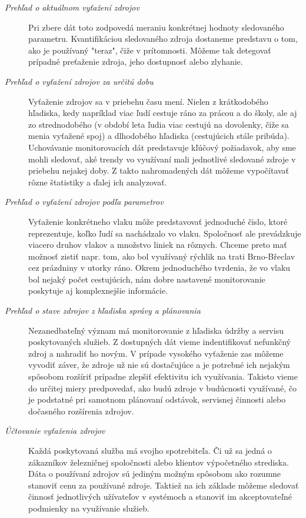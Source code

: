 \documentclass[11pt,final,oneside]{fithesis}
\begin{document}
\begin{description}
\item[\emph{Prehľad o aktuálnom vyťažení zdrojov}]
Pri zbere dát toto zodpovedá meraniu konkrétnej hodnoty sledovaného parametru. Kvantifikáciou sledovaného zdroja dostaneme predstavu o tom, ako je používaný "teraz", čiže v prítomnosti. Môžeme tak detegovať prípadné
preťaženie zdroja, jeho dostupnosť alebo zlyhanie.
\item[\emph{Prehľad o vyťažení zdrojov za určitú dobu}]
Vyťaženie zdrojov sa v priebehu času mení. Nielen z krátkodobého hľadiska, kedy napríklad viac ľudí cestuje ráno za prácou a do školy, ale aj zo strednodobého (v období leta ľudia viac cestujú na dovolenky, čiže sa menia 
vyťažené spoj) a dlhodobého hľadiska (cestujúcich stále pribúda). Uchovávanie monitorovacích dát predstavuje kľúčový požiadavok, aby sme mohli sledovať, aké trendy vo využívaní mali jednotlivé sledované zdroje v priebehu nejakej doby.
Z takto nahromadených dát môžeme vypočítavať rôzne štatistiky a ďalej ich analyzovať.
\item[\emph{Prehľad o vyťažení zdrojov podľa parametrov}]
Vyťaženie konkrétneho vlaku môže predstavovať jednoduché čislo, ktoré reprezentuje, koľko ľudí sa nachádzalo vo vlaku. Spoločnosť ale prevádzkuje viacero druhov vlakov a množstvo liniek na rôznych. Chceme preto mať možnosť
zistiť napr. tom, ako bol využívaný rýchlik na trati Brno-Břeclav cez prázdniny v utorky ráno. Okrem jednoduchého tvrdenia, že vo vlaku bol nejaký počet cestujúcich, nám dobre nastavené monitorovanie poskytuje aj komplexnejšie
informácie.
\item[\emph{Prehľad o stave zdrojov z hľadiska správy a plánovania}]
Nezanedbateľný význam má monitorovanie z hľadiska údržby a servisu poskytovaných služieb. Z dostupných dát vieme indentifikovať nefunkčný zdroj a nahradiť ho novým. V prípade vysokého vyťaženie zas môžeme vyvodiť záver, že zdroje už nie sú
dostačujúce a je potrebné ich nejakým spôsobom rozšíriť prípadne zlepšiť efektivitu ich využívania. Takisto vieme do určitej miery predpovedať, ako budú zdroje v budúcnosti využívané, čo je podstatné pri samotnom plánovaní 
odstávok, servisnej činnosti alebo dočasného rozšírenia zdrojov.
\item[\emph{Účtovanie vyťaženia zdrojov}]
Každá poskytovaná služba má svojho spotrebiteľa. Či už sa jedná o zákazníkov železničnej spoločnosti alebo klientov výpočetného strediska. Dáta o používaní zdrojov sú jediným možným spôsobom ako rozumne stanoviť cenu za používané zdroje.
Taktiež na ich základe môžeme sledovať činnosť jednotlivých užívateľov v systémoch a stanoviť im akceptovateľné podmienky na využívanie služieb.
\end{description}
\end{document}
